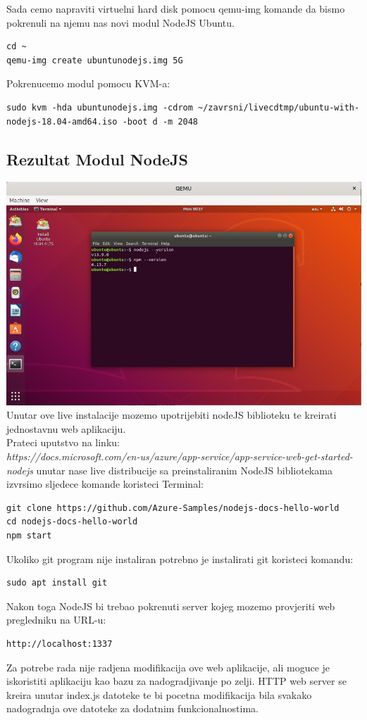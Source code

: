 \documentclass[12pt,vi]{mitthesis}
\begin{document}
\noindent
Sada cemo napraviti virtuelni hard disk pomocu qemu-img komande da bismo pokrenuli na njemu nas novi modul NodeJS Ubuntu.
\begin{lstlisting}[style=BashInputStyle]
cd ~
qemu-img create ubuntunodejs.img 5G
\end{lstlisting}

\noindent 
Pokrenucemo modul pomocu KVM-a:
\begin{lstlisting}[style=BashInputStyle]
sudo kvm -hda ubuntunodejs.img -cdrom ~/zavrsni/livecdtmp/ubuntu-with-nodejs-18.04-amd64.iso -boot d -m 2048
\end{lstlisting}

\subsection*{Rezultat Modul NodeJS}
\includegraphics[width=\linewidth]{images/ModulNodeJSUbuntu.png} 
Unutar ove live instalacije mozemo upotrijebiti nodeJS biblioteku te kreirati jednostavnu web aplikaciju.\\
Prateci uputstvo na linku:\\
\textit{https://docs.microsoft.com/en-us/azure/app-service/app-service-web-get-started-nodejs}
unutar nase live distribucije sa preinstaliranim NodeJS bibliotekama izvrsimo sljedece komande koristeci Terminal:
\begin{lstlisting}[style=BashInputStyle]
git clone https://github.com/Azure-Samples/nodejs-docs-hello-world
cd nodejs-docs-hello-world
npm start
\end{lstlisting}
Ukoliko git program nije instaliran potrebno je instalirati git koristeci komandu:
\begin{lstlisting}[style=BashInputStyle]
sudo apt install git
\end{lstlisting}
Nakon toga NodeJS bi trebao pokrenuti server kojeg mozemo provjeriti web pregledniku na URL-u:
\begin{lstlisting}[style=BashInputStyle]
http://localhost:1337
\end{lstlisting}
Za potrebe rada nije radjena modifikacija ove web aplikacije, ali moguce je iskoristiti aplikaciju kao bazu za nadogradjivanje po zelji. HTTP web server se kreira unutar index.js datoteke te bi pocetna modifikacija bila svakako nadogradnja ove datoteke za dodatnim funkcionalnostima.\\
\end{document}
